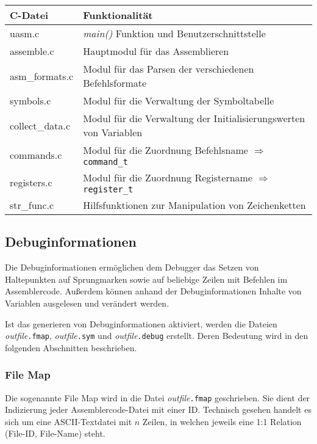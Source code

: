 \begin{center}
\begin{tabular}{ll}
C-Datei      & Funktionalität \\
\hline\hline
uasm.c          & \emph{main()} Funktion und Benutzerschnittstelle           \\
assemble.c      & Hauptmodul für das Assemblieren                            \\
asm\_formats.c  & Modul für das Parsen der verschiedenen Befehlsformate      \\
symbols.c       & Modul für die Verwaltung der Symboltabelle                 \\
collect\_data.c & Modul für die Verwaltung der Initialisierungswerten von Variablen       \\
commands.c      & Modul für die Zuordnung Befehlsname $\Rightarrow$ \texttt{command\_t}   \\
registers.c     & Modul für die Zuordnung Registername $\Rightarrow$ \texttt{register\_t} \\
str\_func.c     & Hilfsfunktionen zur Manipulation von Zeichenketten         \\
\end{tabular}
\end{center}

\subsection{Debuginformationen}

Die Debuginformationen ermöglichen dem Debugger das Setzen von Haltepunkten auf
Sprungmarken sowie auf beliebige Zeilen mit Befehlen im Assemblercode.
Außerdem können anhand der Debuginformationen Inhalte von Variablen ausgelesen
und verändert werden.

Ist das generieren von Debuginformationen aktiviert, werden die Dateien
\emph{outfile}\texttt{.fmap}, \emph{outfile}\texttt{.sym} und
\emph{outfile}\texttt{.debug} erstellt.
Deren Bedeutung wird in den folgenden Abschnitten beschrieben.

\subsubsection{File Map}

Die sogenannte File Map wird in die Datei \emph{outfile}\texttt{.fmap}
geschrieben. Sie dient der Indizierung jeder Assemblercode-Datei mit einer ID.
Technisch gesehen handelt es sich um eine ASCII-Textdatei mit $n$ Zeilen, in
welchen jeweils eine 1:1 Relation (File-ID, File-Name) steht.

